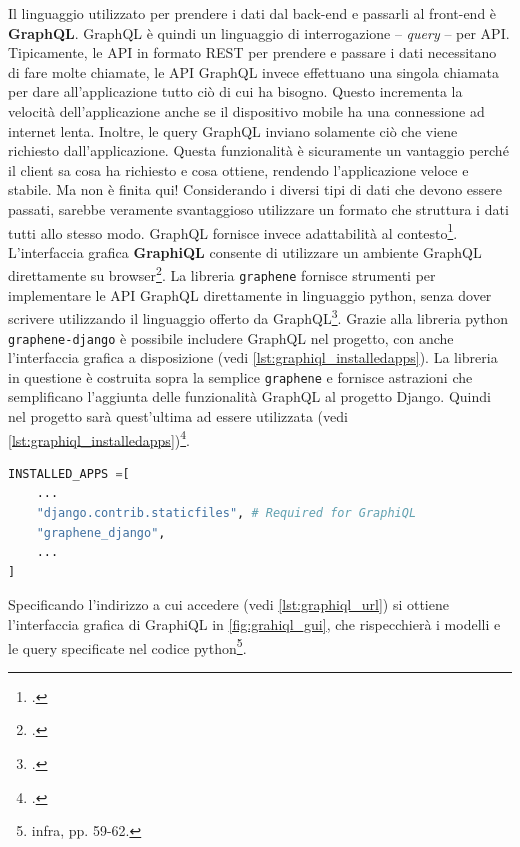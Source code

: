 \documentclass[./main.tex]{subfiles}
\begin{document}
Il linguaggio utilizzato per prendere i dati dal back-end e passarli al front-end è \textbf{GraphQL}. GraphQL è quindi un linguaggio di interrogazione -- \textit{query} -- per API. Tipicamente, le API in formato REST per prendere e passare i dati necessitano di fare molte chiamate, le API GraphQL invece effettuano una singola chiamata per dare all'applicazione tutto ciò di cui ha bisogno. Questo incrementa la velocità dell'applicazione anche se il dispositivo mobile ha una connessione ad internet lenta. Inoltre, le query GraphQL inviano solamente ciò che viene richiesto dall'applicazione. Questa funzionalità è sicuramente un vantaggio perché il client sa cosa ha richiesto e cosa ottiene, rendendo l'applicazione veloce e stabile. Ma non è finita qui! Considerando i diversi tipi di dati che devono essere passati, sarebbe veramente svantaggioso utilizzare un formato che struttura i dati tutti allo stesso modo. GraphQL fornisce invece adattabilità al contesto\footcite[\url{https://graphql.org/}]{website-graphql}. L'interfaccia grafica \textbf{GraphiQL} consente di utilizzare un ambiente GraphQL direttamente su browser\footcite[\url{https://github.com/graphql/graphiql?tab=readme-ov-file\#graphiql}]{website-graphiql}. La libreria \lstinline{graphene} fornisce strumenti per implementare le API GraphQL direttamente in linguaggio python, senza dover scrivere utilizzando il linguaggio offerto da GraphQL\footcite[\url{https://docs.graphene-python.org/en/latest/quickstart/}]{website-graphene-docs}. Grazie alla libreria python \lstinline{graphene-django} è possibile includere GraphQL nel progetto, con anche l'interfaccia grafica a disposizione (vedi \autoref{lst:graphiql_installedapps}). La libreria in questione è costruita sopra la semplice \lstinline{graphene} e fornisce astrazioni che semplificano l'aggiunta delle funzionalità GraphQL al progetto Django. Quindi nel progetto sarà quest'ultima ad essere utilizzata (vedi \autoref{lst:graphiql_installedapps})\footcite[\url{https://docs.graphene-python.org/projects/django/en/latest/}]{website-graphene-docs}.\par

\begin{lstlisting}[language=Python, caption=settings.py, label=lst:graphiql_installedapps]
INSTALLED_APPS =[
    ...
    "django.contrib.staticfiles", # Required for GraphiQL
    "graphene_django",
    ...
]
\end{lstlisting}

Specificando l'indirizzo a cui accedere (vedi \autoref{lst:graphiql_url}) si ottiene l'interfaccia grafica di GraphiQL in \autoref{fig:grahiql_gui}, che rispecchierà i modelli e le query specificate nel codice python\footnote{infra, pp. 59-62.}.\par
\end{document}
